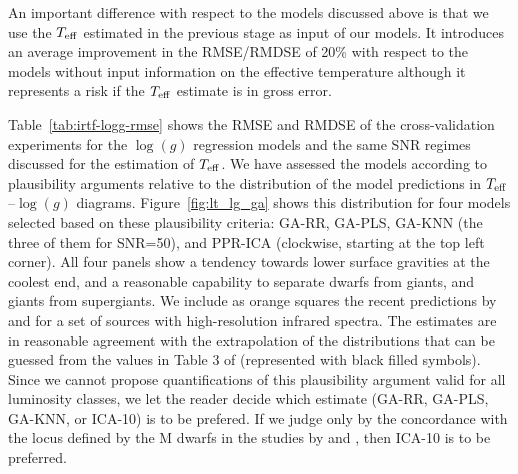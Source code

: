 An important difference with respect to the models discussed
above is that we use the $T_{\rm eff}$ estimated in the previous stage
as input of our models. It introduces an average improvement in the
RMSE/RMDSE of 20\% with respect to the models without input
information on the effective temperature although it represents a risk
if the $T_{\rm eff}$ estimate is in gross error.

Table~\ref{tab:irtf-logg-rmse} shows the RMSE and RMDSE of the
cross-validation experiments for the $\log(g)$ regression models and
the same SNR regimes discussed for the estimation of $T_{\rm eff}$. We
have assessed the models according to plausibility arguments relative
to the distribution of the model predictions in $T_{\rm
eff}$--$\log(g)$ diagrams.  Figure~\ref{fig:lt_lg_ga} shows this
distribution for four models selected based on these plausibility
criteria: GA-RR, GA-PLS, GA-KNN (the three of them for SNR=50), and
PPR-ICA (clockwise, starting at the top left corner). All four panels
show a tendency towards lower surface gravities at the coolest end,
and a reasonable capability to separate dwarfs from giants, and giants
from supergiants. We include as orange squares the recent predictions
by \cite{esm1} and \cite{esm2} for a set of sources with
high-resolution infrared spectra. The estimates are in reasonable
agreement with the extrapolation of the distributions that can be
guessed from the values in Table 3 of \cite{cesetti} (represented with
black filled symbols). Since we cannot propose quantifications of this
plausibility argument valid for all luminosity classes, we let the
reader decide which estimate (GA-RR, GA-PLS, GA-KNN, or ICA-10) is to
be prefered. If we judge only by the concordance with the locus
defined by the M dwarfs in the studies by \cite{esm1} and \cite{esm2},
then ICA-10 is to be preferred.

